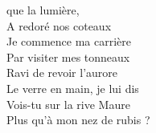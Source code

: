 
 que la lumière,
\\A redoré nos coteaux
\\Je commence ma carrière
\\Par visiter mes tonneaux
\\Ravi de revoir l'aurore
\\Le verre en main, je lui dis
\\Vois-tu sur la rive Maure
\\Plus qu'à mon nez de rubis ?
